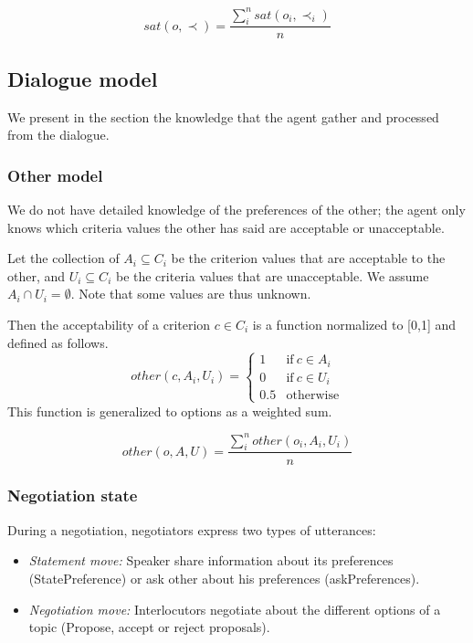\documentclass{llncs}
\begin{document}
				$$sat(o, \prec) = \frac{\sum_{i}^{n} sat(o_i, \prec_i) }{n} $$
				
				
				\subsection{Dialogue model}
				We present in the section the knowledge that the agent gather and processed from the dialogue.
				
				\subsubsection{Other model}
				We do not have detailed knowledge of the preferences of the other; the agent only knows which criteria values the other has said are acceptable or unacceptable.
				
				Let the collection of $A_i \subseteq C_i$ be the criterion values that are acceptable to the other, and $U_i \subseteq C_i$ be the criteria values that are unacceptable.  We assume $A_i \cap U_i = \emptyset$.  Note	that some values are thus unknown.
				
				Then the acceptability of a criterion $c \in C_i$ is a function normalized to [0,1] and defined as follows.
				$$ other(c, A_i, U_i)= \left\{\begin{array}{ll}
				1	 & \mathrm{if\ }  c \in A_i\\
				0    & \mathrm{if\ }c \in U_i\\
				0.5	 & \mathrm{otherwise}
				\end{array}\right.$$
				This function is generalized to options as a weighted sum.
				
				$$other(o, A, U) = \frac{ \sum_{i}^{n} other(o_i, A_i, U_i) } {n}$$ 
				
				\subsubsection{Negotiation state}
				During a negotiation, negotiators express two types of utterances: %
				
				\begin{itemize}
					\item \emph{Statement move:} Speaker share information about its preferences (StatePreference) or ask other about his preferences (askPreferences).
					\item \emph{Negotiation move:} Interlocutors negotiate about the different options of a topic (Propose, accept or reject proposals).
				\end{itemize}
				
\end{document}
